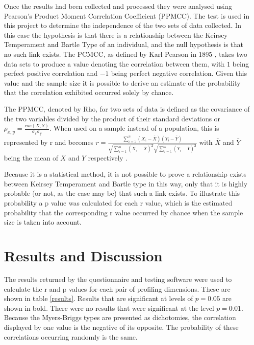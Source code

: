 \documentclass[12pt,a4paper,twoside]{report}
\begin{document}
Once the results had been collected and processed they were analysed using Pearson's Product Moment Correlation Coefficient (PPMCC). The test is used in this project to determine the independence of the two sets of data collected. In this case the hypothesis is that there is a relationship between the Keirsey Temperament and Bartle Type of an individual, and the null hypothesis is that no such link exists. The PCMCC, as defined by Karl Pearson in 1895 \cite{pearson1895note}, takes two data sets to produce a value denoting the correlation between them, with $1$ being perfect positive correlation and $-1$ being perfect negative correlation. Given this value and the sample size it is possible to derive an estimate of the probability that the correlation exhibited occurred solely by chance. 

The PPMCC, denoted by Rho, for two sets of data is defined as the covariance of the two variables divided by the product of their standard deviations or $\rho_{x,y}=\frac{cov(X,Y)}{\sigma_x \sigma_y}$. When used on a sample instead of a population, this is represented by r and becomes $r=\frac{\sum_{i=1}^{n}(X_i-\bar{X})(Y_i-\bar{Y})}{\sqrt{\sum_{i=1}^{n}(X_i-\bar{X})^2}\sqrt{\sum_{i=1}^{n}(Y_i-\bar{Y})^2}}$ with $\bar{X}$ and $\bar{Y}$ being the mean of $X$ and $Y$ respectively \cite{pearson1895note}. 

\vspace{0.1cm}
Because it is a statistical method, it is not possible to prove a relationship exists between Keirsey Temperament and Bartle type in this way, only that it is highly probable (or not, as the case may be) that such a link exists. To illustrate this probability a p value was calculated for each r value, which is the estimated probability that the corresponding r value occurred by chance when the sample size is taken into account.

\section{Results and Discussion}
The results returned by the questionnaire and testing software were used to calculate the r and p values for each pair of profiling dimensions. These are shown in table \ref{results}. Results that are significant at levels of $p = 0.05$ are shown in bold. There were no results that were significant at the level $p = 0.01$. Because the Myers-Briggs types are presented as dichotomies, the correlation displayed by one value is the negative of its opposite. The probability of these correlations occurring randomly is the same.
\end{document}

